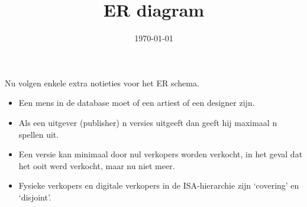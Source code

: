 \documentclass[a4paper, dutch, parskip=full]{scrartcl}
\begin{document}
\title{ER diagram}
\author{}
\date{\today}
\maketitle
Nu volgen enkele extra notieties voor het ER schema.
\begin{itemize}
  \item Een mens in de database moet of een artiest of een designer zijn.
  \item Als een uitgever (publisher) n versies uitgeeft dan geeft hij maximaal n spellen uit.
  \item Een versie kan minimaal door nul verkopers worden verkocht, in het geval dat het ooit werd verkocht, maar nu niet meer.
  \item Fysieke verkopers en digitale verkopers in de ISA-hierarchie zijn `covering' en `disjoint'.
\end{itemize}
\end{document}
